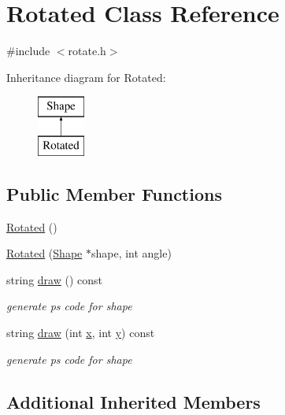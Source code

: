 \hypertarget{class_rotated}{}\section{Rotated Class Reference}
\label{class_rotated}


{\ttfamily \#include $<$rotate.\+h$>$}

Inheritance diagram for Rotated\+:\begin{figure}[H]
\begin{center}
\leavevmode
\includegraphics[height=2.000000cm]{class_rotated}
\end{center}
\end{figure}
\subsection*{Public Member Functions}
\begin{DoxyCompactItemize}
\item 
\hyperlink{class_rotated_a0e7bbab1043b5f83912a3963170160aa}{Rotated} ()
\item 
\hyperlink{class_rotated_aee5f88769baea78d5d2fb8f72ac818cf}{Rotated} (\hyperlink{class_shape}{Shape} $\ast$shape, int angle)
\item 
string \hyperlink{class_rotated_ae36addd682056fbd7acef703dc81fafe}{draw} () const 
\begin{DoxyCompactList}\small\item\em generate ps code for shape \end{DoxyCompactList}\item 
string \hyperlink{class_rotated_a1a83cd3f5a9fe6cd99d3eba826f46dd6}{draw} (int \hyperlink{class_shape_a41e403e73d2949f1a6adfba6032c41ec}{x}, int \hyperlink{class_shape_ac757f715cc5b5681f2c691663ac06f0a}{y}) const 
\begin{DoxyCompactList}\small\item\em generate ps code for shape \end{DoxyCompactList}\end{DoxyCompactItemize}
\subsection*{Additional Inherited Members}


